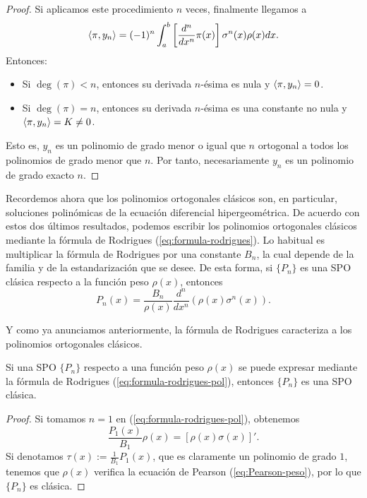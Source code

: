\begin{proof}
    Si aplicamos este procedimiento $n$ veces, finalmente llegamos a 
    $$
    \left\langle \pi , y_n \right\rangle = (-1)^n \int_a^b \left[\dfrac{d^n}{dx^n}\pi(x)\right] \sigma^n(x)\rho(x)dx.
    $$
    Entonces:
    \begin{itemize}
        \item Si $\deg(\pi) < n$, entonces su derivada $n$-ésima es nula y $\left\langle \pi , y_n \right\rangle = 0$.
        \item Si $\deg(\pi) = n$, entonces su derivada $n$-ésima es una constante no nula y $\left\langle \pi , y_n \right\rangle = K\neq 0$.
    \end{itemize}
    Esto es, $y_n$ es un polinomio de grado menor o igual que $n$ ortogonal a todos los polinomios de grado menor que $n$. Por tanto, necesariamente $y_n$ es un polinomio de grado exacto $n$.
\end{proof}

Recordemos ahora que los polinomios ortogonales clásicos son, en particular, soluciones polinómicas de la ecuación diferencial hipergeométrica. De acuerdo con estos dos últimos resultados, podemos escribir los polinomios ortogonales clásicos mediante la fórmula de Rodrigues (\ref{eq:formula-rodrigues}). Lo habitual es multiplicar la fórmula de Rodrigues por una constante $B_n$, la cual depende de la familia y de la estandarización que se desee. De esta forma, si $\{P_n\}$ es una SPO clásica respecto a la función peso $\rho(x)$, entonces
\begin{equation}
    \label{eq:formula-rodrigues-pol}
    P_n(x) = \dfrac {B_n}{\rho(x)} \frac{d^n}{d x^n}(\rho(x)\sigma^n(x)). 
\end{equation} 

Y como ya anunciamos anteriormente, la fórmula de Rodrigues caracteriza a los polinomios ortogonales clásicos.

\begin{teorema}
    \label{th:rodrigues-pearson}
    Si una SPO $\{P_n\}$ respecto a una función peso $\rho(x)$ se puede expresar mediante la fórmula de Rodrigues (\ref{eq:formula-rodrigues-pol}), entonces $\{P_n\}$ es una SPO clásica.
\end{teorema}
\begin{proof}
    Si tomamos $n=1$ en (\ref{eq:formula-rodrigues-pol}), obtenemos
    $$
    \frac{P_1(x)}{B_1}\rho(x) = [\rho(x)\sigma(x)]'.
    $$
    Si denotamos $\tau(x):=\frac{1}{B_1}P_1(x)$, que es claramente un polinomio de grado $1$, tenemos que $\rho(x)$ verifica la ecuación de Pearson (\ref{eq:Pearson-peso}), por lo que $\{P_n\}$ es clásica.
\end{proof}

